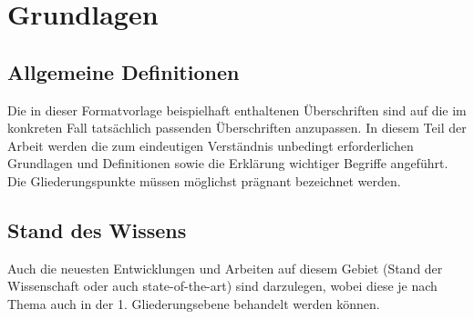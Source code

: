 \chapter{Grundlagen}

\section{Allgemeine Definitionen}
Die in dieser Formatvorlage beispielhaft enthaltenen Überschriften sind auf die im konkreten Fall tatsächlich passenden Überschriften anzupassen.
In diesem Teil der Arbeit werden die zum eindeutigen Verständnis unbedingt erforderlichen Grundlagen und Definitionen sowie die Erklärung wichtiger Begriffe angeführt.
Die Gliederungspunkte müssen möglichst prägnant bezeichnet werden.
\section{Stand des Wissens}
Auch die neuesten Entwicklungen und Arbeiten auf diesem Gebiet (Stand der Wissenschaft oder auch state-of-the-art) sind darzulegen, wobei diese je nach Thema auch in der 1. Gliederungsebene behandelt werden können.
